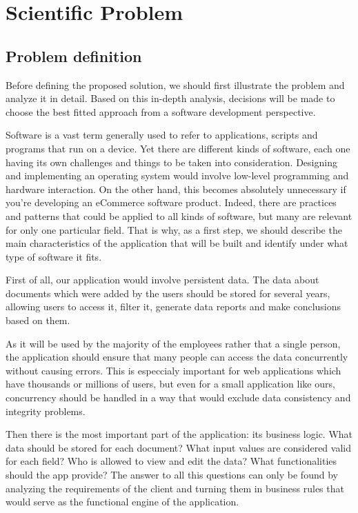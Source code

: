 \chapter{Scientific Problem}
\label{section:scientificProblem}


\section{Problem definition}
\label{section:problemDefinition}

Before defining the proposed solution, we should first illustrate the problem and analyze it in detail. Based on this in-depth analysis, decisions will be made to choose the best fitted approach from a software development perspective.

Software is a vast term generally used to refer to applications, scripts and programs that run on a device. Yet there are different kinds of software, each one having its own challenges and things to be taken into consideration. Designing and implementing an operating system would involve low-level programming and hardware interaction. On the other hand, this becomes absolutely unnecessary if you're developing an eCommerce software product. Indeed, there are practices and patterns that could be applied to all kinds of software, but many are relevant for only one particular field. That is why, as a first step, we should describe the main characteristics of the application that will be built and identify under what type of software it fits.

First of all, our application would involve persistent data. The data about documents which were added by the users should be stored for several years, allowing users to access it, filter it, generate data reports and make conclusions based on them.

As it will be used by the majority of the employees rather that a single person, the application should ensure that many people can access the data concurrently without causing errors. This is especcialy important for web applications which have thousands or millions of users, but even for a small application like ours, concurrency should be handled in a way that would exclude data consistency and integrity problems.

Then there is the most important part of the application: its business logic. What data should be stored for each document? What input values are considered valid for each field? Who is allowed to view and edit the data? What functionalities should the app provide? The answer to all this questions can only be found by analyzing the requirements of the client and turning them in business rules that would serve as the functional engine of the application.

